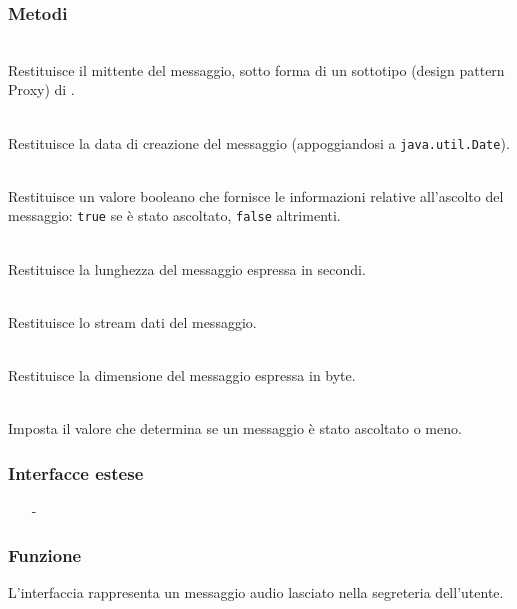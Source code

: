 \subsubsection*{Metodi}
\begin{description}
	\item{}\\
Restituisce il mittente del messaggio, sotto forma di un sottotipo (design pattern Proxy) di .
	\item{}\\
Restituisce la data di creazione del messaggio (appoggiandosi a \texttt{java.util.Date}).
	\item{}\\
Restituisce un valore booleano che fornisce le informazioni relative all'ascolto del messaggio: \texttt{true} se è stato ascoltato, \texttt{false} altrimenti.
	\item{}\\
Restituisce la lunghezza del messaggio espressa in secondi.
	\item{}\\
Restituisce lo stream dati del messaggio.
	\item{}\\
Restituisce la dimensione del messaggio espressa in byte.
	\item{}\\
Imposta il valore che determina se un messaggio è stato ascoltato o meno.

\end{description}


\subsubsection*{Interfacce estese}
\begin{itemize}[noitemsep,nolistsep]
  \item[-] 
\end{itemize}

\subsubsection*{Funzione}
L'interfaccia rappresenta un messaggio audio lasciato nella segreteria dell'utente.

